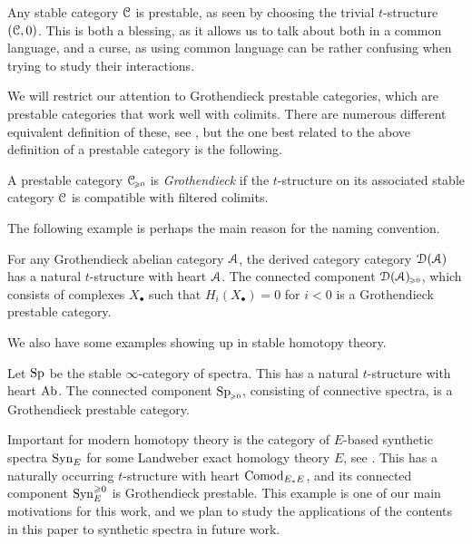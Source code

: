 \begin{remark}
    \label{ch4:rm:stable-is-prestable}
    Any stable category $\EuScript{C}$ is prestable, as seen by choosing the trivial $t$-structure $(\EuScript{C},0)$. This is both a blessing, as it allows us to talk about both in a common language, and a curse, as using common language can be rather confusing when trying to study their interactions.
\end{remark}

We will restrict our attention to Grothendieck prestable categories, which are prestable categories that work well with colimits. There are numerous different equivalent definition of these, see \cite[C.1.4.1]{lurie_SAG}, but the one best related to the above definition of a prestable category is the following. 

\begin{definition}
    A prestable category $\EuScript{C}_{\hspace{-1pt}\scriptscriptstyle\geqslant 0}$ is \emph{Grothendieck} if the $t$-structure on its associated stable category $\EuScript{C}$ is compatible with filtered colimits. 
\end{definition}

The following example is perhaps the main reason for the naming convention.

\begin{example}
    For any Grothendieck abelian category $\EuScript{A}$, the derived category category $\EuScript{D}(\EuScript{A})$ has a natural $t$-structure with heart $\EuScript{A}$. The connected component $\EuScript{D}(\EuScript{A})_{\hspace{-1pt}\scriptscriptstyle\geqslant 0}$, which consists of complexes $X_\bullet$ such that $H_i(X_\bullet) = 0$ for $i<0$ is a Grothendieck prestable category.  
\end{example}

We also have some examples showing up in stable homotopy theory. 

\begin{example}
    Let $\mathrm{Sp}$ be the stable $\infty$-category of spectra. This has a natural $t$-structure with heart $\mathrm{Ab}$. The connected component $\mathrm{Sp}_{\hspace{-1pt}\scriptscriptstyle\geqslant 0}$, consisting of connective spectra, is a Grothendieck prestable category. 
\end{example}

\begin{example}
    Important for modern homotopy theory is the category of $E$-based synthetic spectra $\mathrm{Syn}_{E}$ for some Landweber exact homology theory $E$, see \cite{pstragowski_2022}. This has a naturally occurring $t$-structure with heart $\mathrm{Comod}_{E_*E}$, and its connected component $\mathrm{Syn}_{E}^{\geqslant 0}$ is Grothendieck prestable. This example is one of our main motivations for this work, and we plan to study the applications of the contents in this paper to synthetic spectra in future work. 
\end{example}

